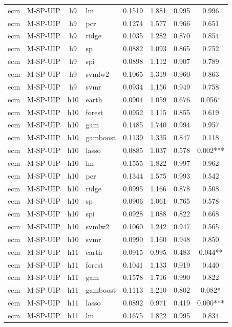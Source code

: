 \begin{ThreePartTable}
\begin{longtable}[t]{llclcccc}
ecm & M-SP-UIP & h9 & lm & 0.1519 & 1.881 & 0.995 & 0.996\\
ecm & M-SP-UIP & h9 & pcr & 0.1274 & 1.577 & 0.966 & 0.651\\
ecm & M-SP-UIP & h9 & ridge & 0.1035 & 1.282 & 0.870 & 0.854\\
ecm & M-SP-UIP & h9 & sp & 0.0882 & 1.093 & 0.865 & 0.752\\
ecm & M-SP-UIP & h9 & spi & 0.0898 & 1.112 & 0.907 & 0.789\\
ecm & M-SP-UIP & h9 & svmlw2 & 0.1065 & 1.319 & 0.960 & 0.863\\
ecm & M-SP-UIP & h9 & svmr & 0.0934 & 1.156 & 0.949 & 0.758\\
\addlinespace
ecm & M-SP-UIP & h10 & earth & 0.0904 & 1.059 & 0.676 & 0.056*\\
ecm & M-SP-UIP & h10 & forest & 0.0952 & 1.115 & 0.855 & 0.619\\
ecm & M-SP-UIP & h10 & gam & 0.1485 & 1.740 & 0.994 & 0.957\\
ecm & M-SP-UIP & h10 & gamboost & 0.1139 & 1.335 & 0.847 & 0.118\\
ecm & M-SP-UIP & h10 & lasso & 0.0885 & 1.037 & 0.578 & 0.002***\\
ecm & M-SP-UIP & h10 & lm & 0.1555 & 1.822 & 0.997 & 0.962\\
ecm & M-SP-UIP & h10 & pcr & 0.1344 & 1.575 & 0.993 & 0.542\\
ecm & M-SP-UIP & h10 & ridge & 0.0995 & 1.166 & 0.878 & 0.508\\
ecm & M-SP-UIP & h10 & sp & 0.0906 & 1.061 & 0.765 & 0.578\\
ecm & M-SP-UIP & h10 & spi & 0.0928 & 1.088 & 0.822 & 0.668\\
ecm & M-SP-UIP & h10 & svmlw2 & 0.1060 & 1.242 & 0.947 & 0.565\\
ecm & M-SP-UIP & h10 & svmr & 0.0990 & 1.160 & 0.948 & 0.850\\
\addlinespace
ecm & M-SP-UIP & h11 & earth & 0.0915 & 0.995 & 0.483 & 0.044**\\
ecm & M-SP-UIP & h11 & forest & 0.1041 & 1.133 & 0.919 & 0.440\\
ecm & M-SP-UIP & h11 & gam & 0.1578 & 1.716 & 0.990 & 0.822\\
ecm & M-SP-UIP & h11 & gamboost & 0.1113 & 1.210 & 0.802 & 0.082*\\
ecm & M-SP-UIP & h11 & lasso & 0.0892 & 0.971 & 0.419 & 0.000***\\
ecm & M-SP-UIP & h11 & lm & 0.1675 & 1.822 & 0.995 & 0.834\\

\end{longtable}
\end{ThreePartTable}

